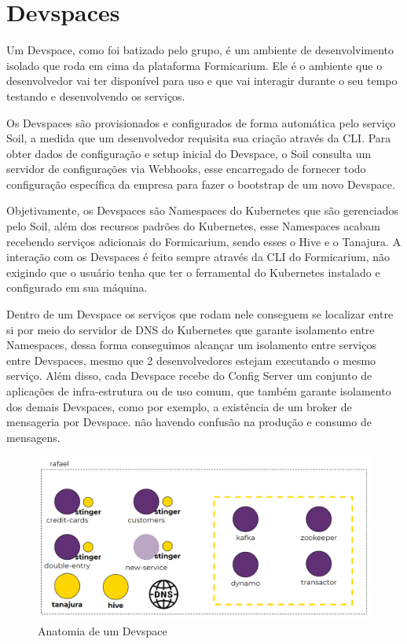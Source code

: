 	\section{Devspaces}
    
    Um Devspace, como foi batizado pelo grupo, é um ambiente de desenvolvimento isolado que roda em cima da plataforma Formicarium. Ele é o ambiente que o desenvolvedor vai ter disponível para uso e que vai interagir durante o seu tempo testando e desenvolvendo os serviços. 
    
    Os Devspaces são provisionados e configurados de forma automática pelo serviço Soil, a medida que um desenvolvedor requisita sua criação através da CLI. Para obter dados de configuração e setup inicial do Devspace, o Soil consulta um servidor de configurações via Webhooks, esse encarregado de fornecer todo configuração específica da empresa para fazer o bootstrap de um novo Devspace.
    
    Objetivamente, os Devspaces são Namespaces do Kubernetes que são gerenciados pelo Soil, além dos recursos padrões do Kubernetes, esse Namespaces acabam recebendo serviços adicionais do Formicarium, sendo esses o Hive e o Tanajura. A interação com os Devspaces é feito sempre através da CLI do Formicarium, não exigindo que o usuário tenha que ter o ferramental do Kubernetes instalado e configurado em sua máquina.
    
    Dentro de um Devspace os serviços que rodam nele conseguem se localizar entre si por meio do servidor de DNS do Kubernetes que garante isolamento entre Namespaces, dessa forma conseguimos alcançar um isolamento entre serviços entre Devspaces, mesmo que 2 desenvolvedores estejam executando o mesmo serviço. Além disso, cada Devspace recebe do Config Server um conjunto de aplicações de infra-estrutura ou de uso comum, que também garante isolamento dos demais Devspaces, como por exemplo, a existência de um broker de mensageria por Devspace. não havendo confusão na produção e consumo de mensagens.
    
        \begin{figure}[htbp]
			\caption{\label{fig_devspace1}Anatomia de um Devspace}
			\begin{center}
			\includegraphics[scale=0.30]{pictures/devspace1.png}
			\end{center}
		\end{figure}
    
